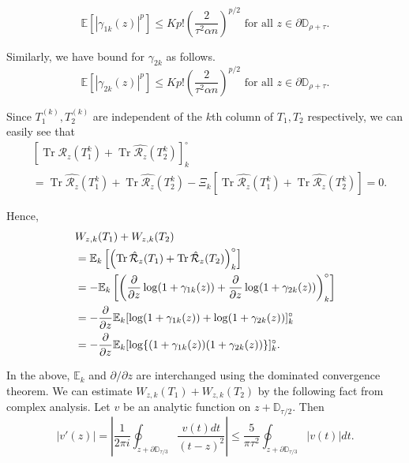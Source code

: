 \documentclass[12pt]{amsart}
\theoremstyle{plain}
\theoremstyle{definition}
\newcommand{\Tr}{\operatorname{Tr}}
\begin{document}
\begin{equation}
    \mathbb{E}[|\gamma_{1k}(z)|^p] \leq K p! \left(\frac{2}{\tau^2 \alpha n}\right)^{p/2} \text{ for all } z \in \partial{\mathbb{D}}_{\rho+\tau}.
    \label{eq: moment of gamma_1k}
\end{equation}

Similarly, we have bound for $\gamma_{2k}$ as follows.
\begin{equation}
    \mathbb{E}[|\gamma_{2k}(z)|^p] \leq K p! \left(\frac{2}{\tau^2 \alpha n}\right)^{p/2} \text{ for all } z \in \partial{\mathbb{D}}_{\rho+\tau}
    \label{eq: moment of gamma_2k}.
\end{equation}

Since $T_{1}^{(k)}, T_{2}^{(k)}$ are independent of the $k$th column of $T_{1}, T_{2}$ respectively, we can easily see that 
\begin{align}
   &\left[\Tr \hat{\mathcal{R}_{z}}(T_1^k)+\Tr \hat{\mathcal{R}_{z}}(T_2^k)\right]_k^\circ \nonumber\\
   &=\Tr \hat{\mathcal{R}_{z}}(T_1^k)+\Tr \hat{\mathcal{R}_{z}}(T_2^k)- \Xi_{k}[\Tr \hat{\mathcal{R}_{z}}(T_1^k)+\Tr \hat{\mathcal{R}_{z}}(T_2^k)] =0 \label{eqn: centering of R after removing kth column}.
\end{align}

Hence, 
\begin{align}
    &W_{z, k}(T_1)+W_{z, k}(T_2)\\
    &= \mathbb{E}_k\left[\left(\Tr \hat{\mathcal{R}}_{z}(T_1)+\Tr \hat{\mathcal{R}}_{z}(T_2)\right)_k^\circ\right]\notag\\
    &= - \mathbb{E}_k\left[\left(\frac{\partial}{\partial z} \operatorname{\log}(1+\gamma_{1k}(z)) + \frac{\partial}{\partial z} \operatorname{\log}(1+\gamma_{2k}(z)) \right)_k^\circ \right]\notag\\
    &= - \frac{\partial}{\partial z} \mathbb{E}_k[\operatorname{\log}(1+\gamma_{1k}(z))+\operatorname{\log}(1+\gamma_{2k}(z))]_k^\circ \notag\\
    &= - \frac{\partial}{\partial z}\mathbb{E}_k
       [\operatorname{\log}\{(1+\gamma_{1k}(z))(1+\gamma_{2k}(z))\}]_k^\circ\label{eq: W_z_k as derivative of log}.
\end{align} 

In the above, $\mathbb{E}_{k}$ and $\partial/\partial z$ are interchanged using the dominated convergence theorem. We can estimate $W_{z,k}(T_1)+W_{z,k}(T_2)$ by the following fact from complex analysis.
Let $v$ be an analytic function on $z+\mathbb{D}_{\tau/2}.$ Then
 \begin{equation}
     |v'(z)| = \left|\frac{1}{2\pi i} \oint_{z+\partial{\mathbb{D}_{\tau/3}}} \frac{v(t)dt}{(t-z)^2}\right| \leq \frac{5}{\pi \tau^2} \oint_{z+\partial{\mathbb{D}_{\tau/3}}}|v(t)|dt\label{eq: Bound on derivative of an analytic function}.
 \end{equation}
\end{document}
